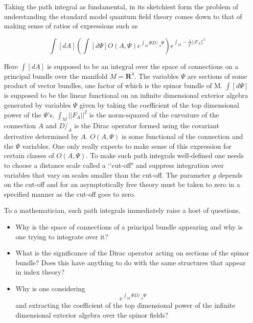 \documentclass[a4paper,a4paper]{article}
\theoremstyle{conjecture}
\def\Slash#1{#1\!\!\!\!/}
\def\Dirac{\Slash D}
\begin{document}
Taking the path integral as fundamental, in its sketchiest form the problem of understanding
the standard model quantum field theory comes down to that of making sense
of ratios of expressions such as

$$\int [dA]  (\int [d\Psi] O(A,\Psi) e^{\int_M
\Psi\Dirac_A\Psi})e^{\int_M -\frac{1}{g^2} ||F_A||^2}$$

Here $\int [dA]$ is supposed to be an integral over the space of connections on
a principal bundle over the manifold $M=\mathbf R^4$. The variables  $\Psi$ are
sections of some product of vector bundles, one factor of which is the spinor bundle of M. $\int [d\Psi]$ is supposed to
be the linear functional on an infinite dimensional exterior algebra generated by variables $\Psi$ given
by taking the coefficient of the top dimensional power of the $\Psi$'s, $\int_M ||F_A||^2$
is the norm-squared of the curvature of the connection $A$ and $\Dirac_A$ is the
Dirac operator formed using the covariant derivative determined by $A$. 
$O(A,\Psi)$
is some functional of the connection and the $\Psi$ variables. One only really expects
to make sense of this expression for certain classes of $O(A,\Psi)$.  To make such path
integrals well-defined one needs to choose a distance scale called a \lq\lq cut-off"
and suppress integration over
variables that vary on scales smaller than the cut-off.  The parameter $g$ depends on the
cut-off and for an asymptotically free theory must be taken to zero in a specified manner
as the cut-off goes to zero.

To a mathematician, such path integrals immediately raise a host of questions.
\begin{itemize}
\item
Why is the space of connections
of a principal bundle appearing and why is one trying to integrate over it?
\item
What is the
significance of the Dirac operator acting on sections of the spinor bundle? Does this
have anything to do with the same structures that appear in index theory?
\item
Why is one considering
$$e^{\int_M\Psi\Dirac_A\Psi}$$
and extracting
the coefficient of the top dimensional power of the infinite dimensional exterior algebra over the spinor fields?
\end{itemize}
\end{document}
